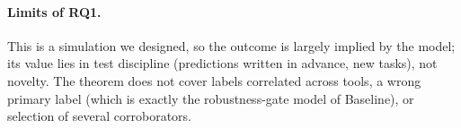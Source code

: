 \paragraph{Limits of RQ1.} This is a simulation we designed, so the outcome is largely implied by the model; its value lies in test discipline (predictions written in advance, new tasks), not novelty. The theorem does not cover labels correlated across tools, a wrong primary label (which is exactly the robustness-gate model of Baseline), or selection of several corroborators.

